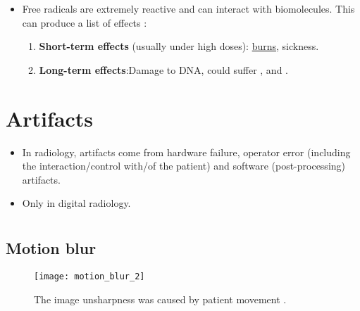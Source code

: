 \begin{itemize}
\item Free radicals are extremely reactive and can interact with
  biomolecules. This can produce a list of effects
  \cite{bushberg2011essential}:
  \begin{enumerate}
  \item \textbf{Short-term effects} (usually under high doses):
    \href{https://en.wikipedia.org/wiki/Radiation_burn}{burns},
    sickness.
  \item \textbf{Long-term effects}:Damage to DNA, could suffer
    , and .
  \end{enumerate}
\end{itemize}

\section{Artifacts}
\begin{itemize}
\item In radiology, artifacts come from hardware failure, operator
  error (including the interaction/control with/of the patient) and
  software (post-processing) artifacts.
\item Only in digital radiology.
\end{itemize}

\section*{}
\subsection{Motion blur}
\vspace{-1ex}
\begin{figure}[!h]
  \centering
  \texttt{[image: motion\_blur\_2]}
  \caption{The image unsharpness was caused by patient movement
    \cite{radiology_key}.\label{fig:motion_blur}}
\end{figure}

\section*{}
